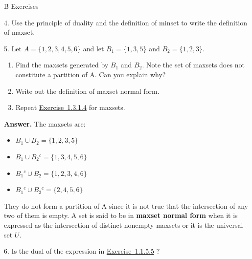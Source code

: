 \documentclass[10pt,]{book}
\newcommand{\terminology}[1]{\textbf{#1}}
\theoremstyle{plain}
\theoremstyle{definition}
\theoremstyle{definition}
\theoremstyle{definition}
\begin{document}
\par\smallskip\noindent
\hypertarget{exercisegroup-9}{}\typeout{************************************************}
\typeout{************************************************}
B Exercises%
\begin{exercisegroup}
\item[4.]\hypertarget{exercise-23}{}  Use the principle of duality and the definition of minset to write the definition of maxset. 
%
\par\smallskip
\item[5.]\hypertarget{exercise-24}{} Let \(A = \{1,2, 3,4, 5, 6\}\) and let \(B_1 = \{1, 3, 5\}\) and \(B _2 = \{1,2, 3\}\).%
\par
\leavevmode%
\begin{enumerate}[label=\alph*]
\item\hypertarget{li-78}{}Find the maxsets generated by \(B_1\) and \(B_2\). Note the set of maxsets does not constitute a partition of A. Can you explain why?%
\item\hypertarget{li-79}{}Write out the definition of maxset normal form.%
\item\hypertarget{li-80}{}Repeat \hyperlink{exercise-minsets-3}{Exercise~1.3.1.4}  for maxsets.%
\end{enumerate}
%
\par\smallskip
\par\smallskip
\noindent\textbf{Answer.}\hypertarget{answer-12}{}\quad
The maxsets are:%
\par
\leavevmode%
\begin{itemize}[label=\textbullet]
\item{} \(B_1\cup B_2=\{1,2,3,5\}\)%
\item{}\(B_1\cup B_2{}^c=\{1,3,4,5,6\}\)%
\item{} \(B_1{}^c\cup B_2=\{1,2,3,4,6\}\)%
\item{} \(B_1{}^c\cup B_2{}^c=\{2,4,5,6\}\)%
\end{itemize}
%
\par
They do not form a partition of A since it is not true that the intersection of any two
 of them is empty. A set is said to be in \terminology{maxset normal form} when it is expressed
  as the intersection of distinct nonempty maxsets or it is the universal set \(U\).%
\item[6.]\hypertarget{exercise-25}{}  Is the dual of the expression in \hyperlink{ex-generalized_distrib}{Exercise~1.1.5.5} ?
%
\par\smallskip
\end{exercisegroup}
\par\smallskip\noindent
%
\backmatter
%
%
%
\typeout{************************************************}
\typeout{************************************************}
\end{document}
